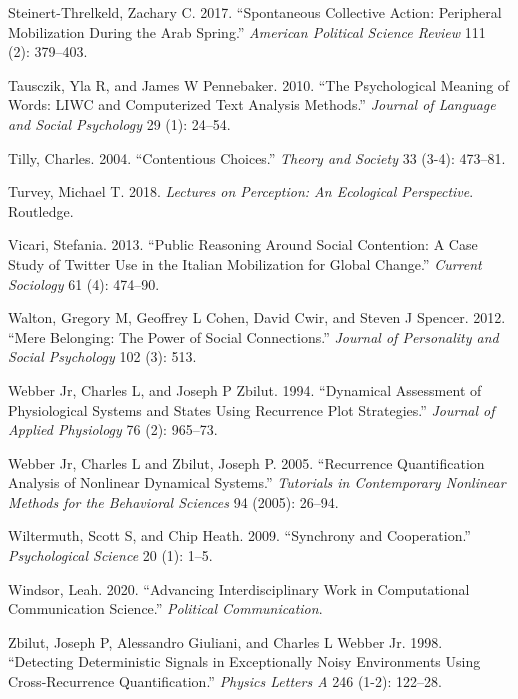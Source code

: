 \documentclass[english,man]{apa6}
\begin{document}
\leavevmode\hypertarget{ref-steinert2017spontaneous}{}%
Steinert-Threlkeld, Zachary C. 2017. ``Spontaneous Collective Action: Peripheral Mobilization During the Arab Spring.'' \emph{American Political Science Review} 111 (2): 379--403.

\leavevmode\hypertarget{ref-tausczik2010psychological}{}%
Tausczik, Yla R, and James W Pennebaker. 2010. ``The Psychological Meaning of Words: LIWC and Computerized Text Analysis Methods.'' \emph{Journal of Language and Social Psychology} 29 (1): 24--54.

\leavevmode\hypertarget{ref-tilly2004contentious}{}%
Tilly, Charles. 2004. ``Contentious Choices.'' \emph{Theory and Society} 33 (3-4): 473--81.

\leavevmode\hypertarget{ref-turvey2018lectures}{}%
Turvey, Michael T. 2018. \emph{Lectures on Perception: An Ecological Perspective}. Routledge.

\leavevmode\hypertarget{ref-vicari2013public}{}%
Vicari, Stefania. 2013. ``Public Reasoning Around Social Contention: A Case Study of Twitter Use in the Italian Mobilization for Global Change.'' \emph{Current Sociology} 61 (4): 474--90.

\leavevmode\hypertarget{ref-walton2012mere}{}%
Walton, Gregory M, Geoffrey L Cohen, David Cwir, and Steven J Spencer. 2012. ``Mere Belonging: The Power of Social Connections.'' \emph{Journal of Personality and Social Psychology} 102 (3): 513.

\leavevmode\hypertarget{ref-webber1994dynamical}{}%
Webber Jr, Charles L, and Joseph P Zbilut. 1994. ``Dynamical Assessment of Physiological Systems and States Using Recurrence Plot Strategies.'' \emph{Journal of Applied Physiology} 76 (2): 965--73.

\leavevmode\hypertarget{ref-webber2005recurrence}{}%
Webber Jr, Charles L and Zbilut, Joseph P. 2005. ``Recurrence Quantification Analysis of Nonlinear Dynamical Systems.'' \emph{Tutorials in Contemporary Nonlinear Methods for the Behavioral Sciences} 94 (2005): 26--94.

\leavevmode\hypertarget{ref-wiltermuth2009synchrony}{}%
Wiltermuth, Scott S, and Chip Heath. 2009. ``Synchrony and Cooperation.'' \emph{Psychological Science} 20 (1): 1--5.

\leavevmode\hypertarget{ref-Windsor2020}{}%
Windsor, Leah. 2020. ``Advancing Interdisciplinary Work in Computational Communication Science.'' \emph{Political Communication}.

\leavevmode\hypertarget{ref-zbilut1998detecting}{}%
Zbilut, Joseph P, Alessandro Giuliani, and Charles L Webber Jr. 1998. ``Detecting Deterministic Signals in Exceptionally Noisy Environments Using Cross-Recurrence Quantification.'' \emph{Physics Letters A} 246 (1-2): 122--28.
\end{document}
